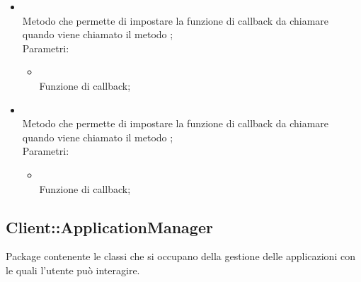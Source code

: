 \begin{itemize}
\begin{itemize}
		\item[]  \\
		Metodo che permette di impostare la funzione di callback da chiamare quando viene chiamato il metodo ;\\
		Parametri:
		\begin{itemize}
			\item {} \\
			Funzione di callback;
		\end{itemize}
		\item[]  \\
		Metodo che permette di impostare la funzione di callback da chiamare quando viene chiamato il metodo ;\\
		Parametri:
		\begin{itemize}
			\item {} \\
			Funzione di callback;
		\end{itemize}
	\end{itemize}
\end{itemize}
\FloatBarrier

\subsection{Client::ApplicationManager}
Package contenente le classi che si occupano della gestione delle applicazioni con le quali l'utente può interagire.
